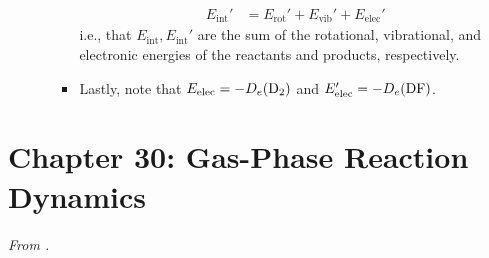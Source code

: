 \documentclass[../notes.tex]{subfiles}
\begin{document}
\begin{itemize}
\begin{itemize}
\begin{itemize}
\begin{align*}
                E_\text{int}' &= E_\text{rot}'+E_\text{vib}'+E_\text{elec}'
            \end{align*}
            i.e., that $E_\text{int},E_\text{int}'$ are the sum of the rotational, vibrational, and electronic energies of the reactants and products, respectively.
            \item Lastly, note that $E_\text{elec}=-D_e(\ce{D2})$ and $E_\text{elec}'=-D_e(\ce{DF})$.
        \end{itemize}
    \end{itemize}
\end{itemize}



\section{Chapter 30: Gas-Phase Reaction Dynamics}
\emph{From \textcite{bib:McQuarrieSimon}.}
\end{document}
